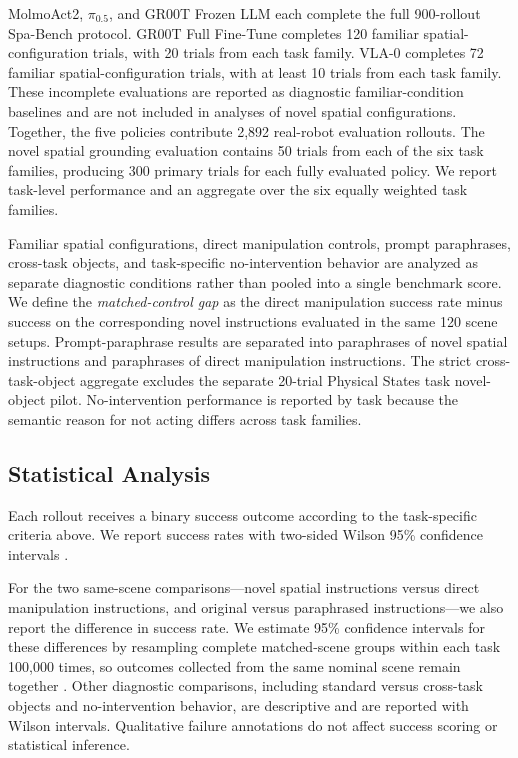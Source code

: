 \documentclass[conference]{IEEEtran}
\begin{document}
MolmoAct2, $\pi_{0.5}$, and GR00T Frozen LLM each complete the full 900-rollout Spa-Bench protocol. GR00T Full Fine-Tune completes 120 familiar spatial-configuration trials, with 20 trials from each task family. VLA-0 completes 72 familiar spatial-configuration trials, with at least 10 trials from each task family. These incomplete evaluations are reported as diagnostic familiar-condition baselines and are not included in analyses of novel spatial configurations. Together, the five policies contribute 2,892 real-robot evaluation rollouts. The novel spatial grounding evaluation contains 50 trials from each of the six task families, producing 300 primary trials for each fully evaluated policy. We report task-level performance and an aggregate over the six equally weighted task families.

Familiar spatial configurations, direct manipulation controls, prompt paraphrases, cross-task objects, and task-specific no-intervention behavior are analyzed as separate diagnostic conditions rather than pooled into a single benchmark score. We define the \emph{matched-control gap} as the direct manipulation success rate minus success on the corresponding novel instructions evaluated in the same 120 scene setups. Prompt-paraphrase results are separated into paraphrases of novel spatial instructions and paraphrases of direct manipulation instructions. The strict cross-task-object aggregate excludes the separate 20-trial Physical States task novel-object pilot. No-intervention performance is reported by task because the semantic reason for not acting differs across task families.

\subsection{Statistical Analysis}
\label{sec:statistical_analysis}

Each rollout receives a binary success outcome according to the task-specific criteria above. We report success rates with two-sided Wilson 95\% confidence intervals \cite{wilson1927}.

For the two same-scene comparisons---novel spatial instructions versus direct manipulation instructions, and original versus paraphrased instructions---we also report the difference in success rate. We estimate 95\% confidence intervals for these differences by resampling complete matched-scene groups within each task 100,000 times, so outcomes collected from the same nominal scene remain together \cite{efron1979bootstrap,field2007cluster}. Other diagnostic comparisons, including standard versus cross-task objects and no-intervention behavior, are descriptive and are reported with Wilson intervals. Qualitative failure annotations do not affect success scoring or statistical inference.
\end{document}
